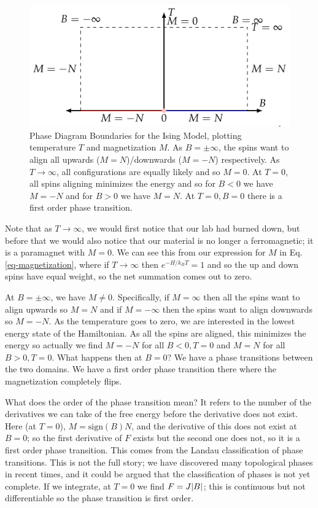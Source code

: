 \begin{figure}[htbp]
    \centering
    \includegraphics{Images/fig-Isingphasediagramboundaries.pdf}
    
    \caption{Phase Diagram Boundaries for the Ising Model, plotting temperature $T$ and magnetization $M$. As $B = \pm \infty$, the spins want to align all upwards ($M = N$)/downwards ($M = -N$) respectively. As $T \to \infty$, all configurations are equally likely and so $M = 0$. At $T = 0$, all spins aligning minimizes the energy and so for $B < 0$ we have $M = -N$ and for $B > 0$ we have $M = N$. At $T = 0, B = 0$ there is a first order phase transition.}
    \label{fig-Isingphasediagramboundaries}
\end{figure}

Note that as $T \to \infty$, we would first notice that our lab had burned down, but before that we would also notice that our material is no longer a ferromagnetic; it is a paramagnet with $M = 0$. We can see this from our expression for $M$ in Eq. \eqref{eq-magnetization}, where if $T \to \infty$ then $e^{-H/k_B T} = 1$ and so the up and down spins have equal weight, so the net summation comes out to zero.

At $B = \pm \infty$, we have $M \neq 0$. Specifically, if $M = \infty$ then all the spins want to align upwards so $M = N$ and if $M = -\infty$ then the spins want to align downwards so $M = -N$. As the temperature goes to zero, we are interested in the lowest energy state of the Hamiltonian. As all the spins are aligned, this minimizes the energy so actually we find $M = -N$ for all $B < 0, T = 0$ and $M = N$ for all $B > 0, T = 0$. What happens then at $B = 0$? We have a phase transitions between the two domains. We have a first order phase transition there where the magnetization completely flips.

What does the order of the phase transition mean? It refers to the number of the derivatives we can take of the free energy before the derivative does not exist. Here (at $T = 0$), $M = \text{sign}(B) N$, and the derivative of this does not exist at $B = 0$; so the first derivative of $F$ exists but the second one does not, so it is a first order phase transition. This comes from the Landau classification of phase transitions. This is not the full story; we have discovered many topological phases in recent times, and it could be argued that the classification of phases is not yet complete. If we integrate, at $T = 0$ we find $F = J\lvert B \rvert$; this is continuous but not differentiable so the phase transition is first order.

